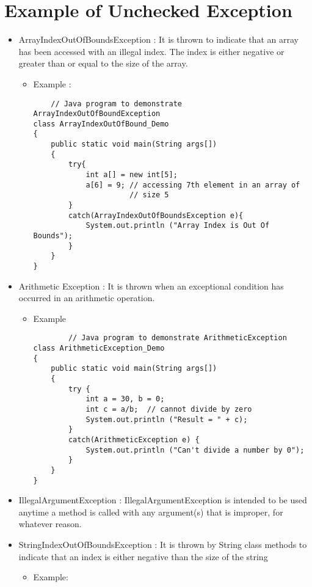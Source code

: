 \documentclass{article}
\begin{document}
\section{Example of Unchecked Exception}
\begin{itemize}

\item ArrayIndexOutOfBoundsException : It is thrown to indicate that an array has been accessed with an illegal index. The index is either negative or greater than or equal to the size of the array.
\begin{itemize}
    \item Example :
    \begin{lstlisting}
    // Java program to demonstrate ArrayIndexOutOfBoundException 
class ArrayIndexOutOfBound_Demo 
{ 
    public static void main(String args[]) 
    { 
        try{ 
            int a[] = new int[5]; 
            a[6] = 9; // accessing 7th element in an array of 
                      // size 5 
        } 
        catch(ArrayIndexOutOfBoundsException e){ 
            System.out.println ("Array Index is Out Of Bounds"); 
        } 
    } 
} 
    \end{lstlisting}
\end{itemize}
\item Arithmetic Exception : It is thrown when an exceptional condition has occurred in an arithmetic operation.
    \begin{itemize}
        \item Example
        \begin{lstlisting}
        // Java program to demonstrate ArithmeticException 
class ArithmeticException_Demo 
{ 
    public static void main(String args[]) 
    { 
        try { 
            int a = 30, b = 0; 
            int c = a/b;  // cannot divide by zero 
            System.out.println ("Result = " + c); 
        } 
        catch(ArithmeticException e) { 
            System.out.println ("Can't divide a number by 0"); 
        } 
    } 
}
        \end{lstlisting}
    \end{itemize}
\item IllegalArgumentException : IllegalArgumentException is intended to be used anytime a method is called with any argument(s) that is improper, for whatever reason.
\item StringIndexOutOfBoundsException : It is thrown by String class methods to indicate that an index is either negative than the size of the string
    \begin{itemize}
        \item Example:
        \begin{lstlisting}
        

\end{lstlisting}
\end{itemize}
\end{itemize}
\end{document}
